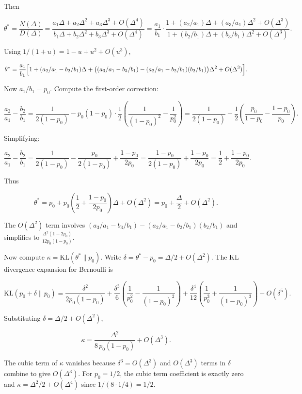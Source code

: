 \documentclass[
  12pt,
]{ctexart}
\begin{document}
Then

\[
\theta^* = \frac{N(\Delta)}{D(\Delta)} = \frac{a_1\Delta + a_2\Delta^2 + a_3\Delta^3 + O(\Delta^4)}{b_1\Delta + b_2\Delta^2 + b_3\Delta^3 + O(\Delta^4)}
= \frac{a_1}{b_1} \cdot \frac{1 + (a_2/a_1)\Delta + (a_3/a_1)\Delta^2 + O(\Delta^3)}{1 + (b_2/b_1)\Delta + (b_3/b_1)\Delta^2 + O(\Delta^3)}.
\]

Using \(1/(1+u) = 1 - u + u^2 + O(u^3)\),

\[
\theta^* = \frac{a_1}{b_1}\Bigl[1 + (a_2/a_1 - b_2/b_1)\Delta + \bigl((a_3/a_1 - b_3/b_1) - (a_2/a_1 - b_2/b_1)(b_2/b_1)\bigr)\Delta^2 + O(\Delta^3)\Bigr].
\]

Now \(a_1/b_1 = p_0\). Compute the first-order correction:

\[
\frac{a_2}{a_1} - \frac{b_2}{b_1}
= \frac{1}{2(1-p_0)} - p_0(1-p_0)\cdot\frac{1}{2}\!\left(\frac{1}{(1-p_0)^2} - \frac{1}{p_0^2}\right)
= \frac{1}{2(1-p_0)} - \frac{1}{2}\!\left(\frac{p_0}{1-p_0} - \frac{1-p_0}{p_0}\right).
\]

Simplifying:

\[
\frac{a_2}{a_1} - \frac{b_2}{b_1}
= \frac{1}{2(1-p_0)} - \frac{p_0}{2(1-p_0)} + \frac{1-p_0}{2p_0}
= \frac{1-p_0}{2(1-p_0)} + \frac{1-p_0}{2p_0}
= \frac{1}{2} + \frac{1-p_0}{2p_0}.
\]

Thus

\[
\theta^* = p_0 + p_0\left(\frac{1}{2} + \frac{1-p_0}{2p_0}\right)\Delta + O(\Delta^2)
= p_0 + \frac{\Delta}{2} + O(\Delta^2).
\]

The \(O(\Delta^2)\) term involves
\((a_3/a_1 - b_3/b_1) - (a_2/a_1 - b_2/b_1)(b_2/b_1)\) and simplifies to
\(\frac{\Delta^2(1-2p_0)}{12 p_0(1-p_0)}\).

Now compute \(\kappa = \text{KL}(\theta^*\|p_0)\). Write
\(\delta = \theta^* - p_0 = \Delta/2 + O(\Delta^2)\). The KL divergence
expansion for Bernoulli is

\[
\text{KL}(p_0+\delta\|p_0) = \frac{\delta^2}{2p_0(1-p_0)}
+ \frac{\delta^3}{6}\!\left(\frac{1}{p_0^2} - \frac{1}{(1-p_0)^2}\right)
+ \frac{\delta^4}{12}\!\left(\frac{1}{p_0^3} + \frac{1}{(1-p_0)^3}\right) + O(\delta^5).
\]

Substituting \(\delta = \Delta/2 + O(\Delta^2)\),

\[
\kappa = \frac{\Delta^2}{8\,p_0(1-p_0)} + O(\Delta^3).
\]

The cubic term of \(\kappa\) vanishes because \(\delta^3 = O(\Delta^3)\)
and \(O(\Delta^3)\) terms in \(\delta\) combine to give \(O(\Delta^3)\).
For \(p_0=1/2\), the cubic term coefficient is exactly zero and
\(\kappa = \Delta^2/2 + O(\Delta^4)\) since \(1/(8\cdot 1/4) = 1/2\).
\end{document}
